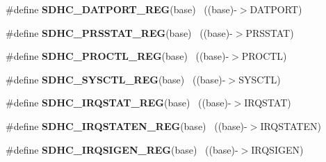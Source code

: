 \begin{DoxyCompactItemize}
\item 
\hypertarget{group___s_d_h_c___register___accessor___macros_ga89e52da8690fb9ad00aa570076cb2061}{}\#define {\bfseries S\+D\+H\+C\+\_\+\+D\+A\+T\+P\+O\+R\+T\+\_\+\+R\+E\+G}(base)                                  ~((base)-\/$>$D\+A\+T\+P\+O\+R\+T)\label{group___s_d_h_c___register___accessor___macros_ga89e52da8690fb9ad00aa570076cb2061}

\item 
\hypertarget{group___s_d_h_c___register___accessor___macros_ga916e0f0f8580bd37b945ac511d59fd0c}{}\#define {\bfseries S\+D\+H\+C\+\_\+\+P\+R\+S\+S\+T\+A\+T\+\_\+\+R\+E\+G}(base)                                  ~((base)-\/$>$P\+R\+S\+S\+T\+A\+T)\label{group___s_d_h_c___register___accessor___macros_ga916e0f0f8580bd37b945ac511d59fd0c}

\item 
\hypertarget{group___s_d_h_c___register___accessor___macros_gaef9e707dc5cec701ae1c34b766590cc2}{}\#define {\bfseries S\+D\+H\+C\+\_\+\+P\+R\+O\+C\+T\+L\+\_\+\+R\+E\+G}(base)                                    ~((base)-\/$>$P\+R\+O\+C\+T\+L)\label{group___s_d_h_c___register___accessor___macros_gaef9e707dc5cec701ae1c34b766590cc2}

\item 
\hypertarget{group___s_d_h_c___register___accessor___macros_ga77c048b22d2a1a655a1973af9241ba59}{}\#define {\bfseries S\+D\+H\+C\+\_\+\+S\+Y\+S\+C\+T\+L\+\_\+\+R\+E\+G}(base)                                    ~((base)-\/$>$S\+Y\+S\+C\+T\+L)\label{group___s_d_h_c___register___accessor___macros_ga77c048b22d2a1a655a1973af9241ba59}

\item 
\hypertarget{group___s_d_h_c___register___accessor___macros_ga13509728d6cd94b3c4ec554aae8b62c3}{}\#define {\bfseries S\+D\+H\+C\+\_\+\+I\+R\+Q\+S\+T\+A\+T\+\_\+\+R\+E\+G}(base)                                  ~((base)-\/$>$I\+R\+Q\+S\+T\+A\+T)\label{group___s_d_h_c___register___accessor___macros_ga13509728d6cd94b3c4ec554aae8b62c3}

\item 
\hypertarget{group___s_d_h_c___register___accessor___macros_ga1f18fa74de2e67064a677032f2fea791}{}\#define {\bfseries S\+D\+H\+C\+\_\+\+I\+R\+Q\+S\+T\+A\+T\+E\+N\+\_\+\+R\+E\+G}(base)                              ~((base)-\/$>$I\+R\+Q\+S\+T\+A\+T\+E\+N)\label{group___s_d_h_c___register___accessor___macros_ga1f18fa74de2e67064a677032f2fea791}

\item 
\hypertarget{group___s_d_h_c___register___accessor___macros_ga6fbc0953522e136b24401f4a068c132a}{}\#define {\bfseries S\+D\+H\+C\+\_\+\+I\+R\+Q\+S\+I\+G\+E\+N\+\_\+\+R\+E\+G}(base)                                ~((base)-\/$>$I\+R\+Q\+S\+I\+G\+E\+N)\label{group___s_d_h_c___register___accessor___macros_ga6fbc0953522e136b24401f4a068c132a}


\end{DoxyCompactItemize}
